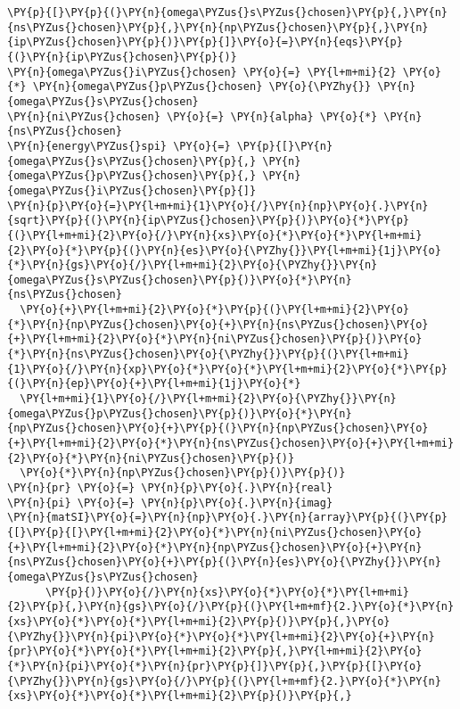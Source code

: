 \begin{Verbatim}[commandchars=\\\{\}]
\PY{p}{[}\PY{p}{(}\PY{n}{omega\PYZus{}s\PYZus{}chosen}\PY{p}{,}\PY{n}{ns\PYZus{}chosen}\PY{p}{,}\PY{n}{np\PYZus{}chosen}\PY{p}{,}\PY{n}{ip\PYZus{}chosen}\PY{p}{)}\PY{p}{]}\PY{o}{=}\PY{n}{eqs}\PY{p}{(}\PY{n}{ip\PYZus{}chosen}\PY{p}{)}
\PY{n}{omega\PYZus{}i\PYZus{}chosen} \PY{o}{=} \PY{l+m+mi}{2} \PY{o}{*} \PY{n}{omega\PYZus{}p\PYZus{}chosen} \PY{o}{\PYZhy{}} \PY{n}{omega\PYZus{}s\PYZus{}chosen}
\PY{n}{ni\PYZus{}chosen} \PY{o}{=} \PY{n}{alpha} \PY{o}{*} \PY{n}{ns\PYZus{}chosen}
\PY{n}{energy\PYZus{}spi} \PY{o}{=} \PY{p}{[}\PY{n}{omega\PYZus{}s\PYZus{}chosen}\PY{p}{,} \PY{n}{omega\PYZus{}p\PYZus{}chosen}\PY{p}{,} \PY{n}{omega\PYZus{}i\PYZus{}chosen}\PY{p}{]}
\PY{n}{p}\PY{o}{=}\PY{l+m+mi}{1}\PY{o}{/}\PY{n}{np}\PY{o}{.}\PY{n}{sqrt}\PY{p}{(}\PY{n}{ip\PYZus{}chosen}\PY{p}{)}\PY{o}{*}\PY{p}{(}\PY{l+m+mi}{2}\PY{o}{/}\PY{n}{xs}\PY{o}{*}\PY{o}{*}\PY{l+m+mi}{2}\PY{o}{*}\PY{p}{(}\PY{n}{es}\PY{o}{\PYZhy{}}\PY{l+m+mi}{1j}\PY{o}{*}\PY{n}{gs}\PY{o}{/}\PY{l+m+mi}{2}\PY{o}{\PYZhy{}}\PY{n}{omega\PYZus{}s\PYZus{}chosen}\PY{p}{)}\PY{o}{*}\PY{n}{ns\PYZus{}chosen}
  \PY{o}{+}\PY{l+m+mi}{2}\PY{o}{*}\PY{p}{(}\PY{l+m+mi}{2}\PY{o}{*}\PY{n}{np\PYZus{}chosen}\PY{o}{+}\PY{n}{ns\PYZus{}chosen}\PY{o}{+}\PY{l+m+mi}{2}\PY{o}{*}\PY{n}{ni\PYZus{}chosen}\PY{p}{)}\PY{o}{*}\PY{n}{ns\PYZus{}chosen}\PY{o}{\PYZhy{}}\PY{p}{(}\PY{l+m+mi}{1}\PY{o}{/}\PY{n}{xp}\PY{o}{*}\PY{o}{*}\PY{l+m+mi}{2}\PY{o}{*}\PY{p}{(}\PY{n}{ep}\PY{o}{+}\PY{l+m+mi}{1j}\PY{o}{*}
  \PY{l+m+mi}{1}\PY{o}{/}\PY{l+m+mi}{2}\PY{o}{\PYZhy{}}\PY{n}{omega\PYZus{}p\PYZus{}chosen}\PY{p}{)}\PY{o}{*}\PY{n}{np\PYZus{}chosen}\PY{o}{+}\PY{p}{(}\PY{n}{np\PYZus{}chosen}\PY{o}{+}\PY{l+m+mi}{2}\PY{o}{*}\PY{n}{ns\PYZus{}chosen}\PY{o}{+}\PY{l+m+mi}{2}\PY{o}{*}\PY{n}{ni\PYZus{}chosen}\PY{p}{)}
  \PY{o}{*}\PY{n}{np\PYZus{}chosen}\PY{p}{)}\PY{p}{)}
\PY{n}{pr} \PY{o}{=} \PY{n}{p}\PY{o}{.}\PY{n}{real}
\PY{n}{pi} \PY{o}{=} \PY{n}{p}\PY{o}{.}\PY{n}{imag}
\PY{n}{matSI}\PY{o}{=}\PY{n}{np}\PY{o}{.}\PY{n}{array}\PY{p}{(}\PY{p}{[}\PY{p}{[}\PY{l+m+mi}{2}\PY{o}{*}\PY{n}{ni\PYZus{}chosen}\PY{o}{+}\PY{l+m+mi}{2}\PY{o}{*}\PY{n}{np\PYZus{}chosen}\PY{o}{+}\PY{n}{ns\PYZus{}chosen}\PY{o}{+}\PY{p}{(}\PY{n}{es}\PY{o}{\PYZhy{}}\PY{n}{omega\PYZus{}s\PYZus{}chosen}
      \PY{p}{)}\PY{o}{/}\PY{n}{xs}\PY{o}{*}\PY{o}{*}\PY{l+m+mi}{2}\PY{p}{,}\PY{n}{gs}\PY{o}{/}\PY{p}{(}\PY{l+m+mf}{2.}\PY{o}{*}\PY{n}{xs}\PY{o}{*}\PY{o}{*}\PY{l+m+mi}{2}\PY{p}{)}\PY{p}{,}\PY{o}{\PYZhy{}}\PY{n}{pi}\PY{o}{*}\PY{o}{*}\PY{l+m+mi}{2}\PY{o}{+}\PY{n}{pr}\PY{o}{*}\PY{o}{*}\PY{l+m+mi}{2}\PY{p}{,}\PY{l+m+mi}{2}\PY{o}{*}\PY{n}{pi}\PY{o}{*}\PY{n}{pr}\PY{p}{]}\PY{p}{,}\PY{p}{[}\PY{o}{\PYZhy{}}\PY{n}{gs}\PY{o}{/}\PY{p}{(}\PY{l+m+mf}{2.}\PY{o}{*}\PY{n}{xs}\PY{o}{*}\PY{o}{*}\PY{l+m+mi}{2}\PY{p}{)}\PY{p}{,}

\end{Verbatim}
